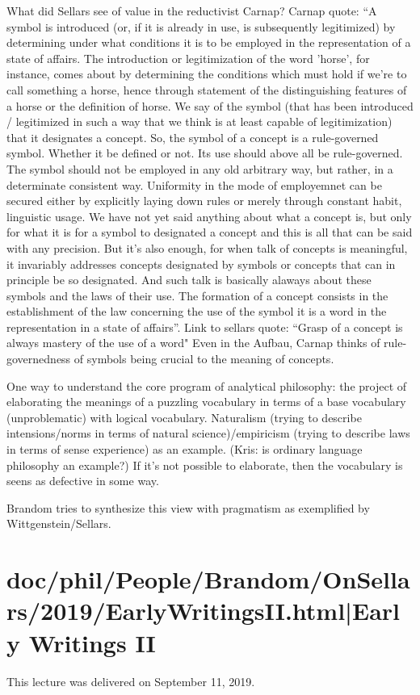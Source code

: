 \documentclass[12pt,a4paper]{report}
\begin{document}
What did Sellars see of value in the reductivist Carnap? Carnap quote: ``A symbol is introduced (or, if it is already in use, is subsequently legitimized) by determining under what conditions it is to be employed in the representation of a state of affairs. The introduction or legitimization of the word 'horse', for instance, comes about by determining the conditions which must hold if we're to call something a horse, hence through statement of the distinguishing features of a horse or the definition of horse. We say of the symbol (that has been introduced / legitimized in such a way that we think is at least capable of legitimization) that it designates a concept. So, the symbol of a concept is a rule-governed symbol. Whether it be defined or not. Its use should above all be rule-governed. The symbol should not be employed in any old arbitrary way, but rather, in a determinate consistent way. Uniformity in the mode of employemnet can be secured either by explicitly laying down rules or merely through constant habit, linguistic usage. We have not yet said anything about what a concept is, but only for what it is for a symbol to designated a concept and this is all that can be said with any precision. But it's also enough, for when talk of concepts is meaningful, it invariably addresses concepts designated by symbols or concepts that can in principle be so designated. And such talk is basically alaways about these symbols and the laws of their use. The formation of a concept consists in the establishment of the law concerning the use of the symbol it is a word in the representation in a state of affairs''. Link to sellars quote: ``Grasp of a concept is always mastery of the use of a word" Even in the Aufbau, Carnap thinks of rule-governedness of symbols being crucial to the meaning of concepts.

One way to understand the core program of analytical philosophy: the project of elaborating the meanings of a puzzling vocabulary in terms of a base vocabulary (unproblematic) with logical vocabulary. Naturalism (trying to describe intensions/norms in terms of natural science)/empiricism (trying to describe laws in terms of sense experience) as an example. (Kris: is ordinary language philosophy an example?) If it's not possible to elaborate, then the vocabulary is seens as defective in some way.

Brandom tries to synthesize this view with pragmatism as exemplified by Wittgenstein/Sellars.
\section{doc/phil/People/Brandom/OnSellars/2019/EarlyWritingsII.html|Early Writings II}
This lecture was delivered on September 11, 2019.
\end{document}
